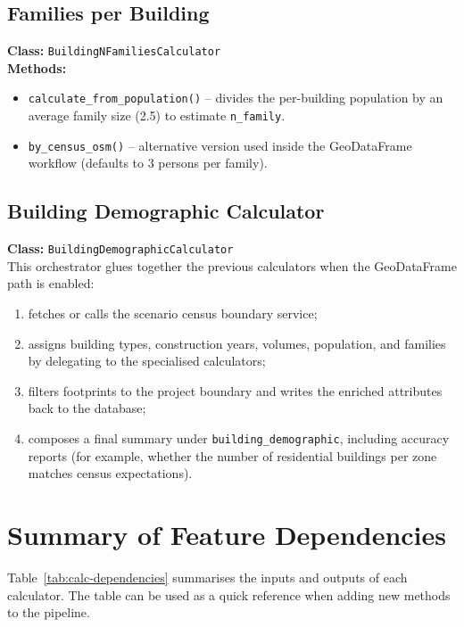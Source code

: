 \subsection{Families per Building}
\textbf{Class:} \texttt{BuildingNFamiliesCalculator}\\
\textbf{Methods:}
\begin{itemize}[leftmargin=2em]
    \item \texttt{calculate\_from\_population()} – divides the per-building
    population by an average family size (2.5) to estimate
    \texttt{n\_family}.
    \item \texttt{by\_census\_osm()} – alternative version used inside the
    GeoDataFrame workflow (defaults to 3 persons per family).
\end{itemize}

\subsection{Building Demographic Calculator}
\textbf{Class:} \texttt{BuildingDemographicCalculator}\\
This orchestrator glues together the previous calculators when the
GeoDataFrame path is enabled:
\begin{enumerate}[label=\alph*),leftmargin=2em]
    \item fetches or calls the scenario census boundary service;
    \item assigns building types, construction years, volumes, population,
    and families by delegating to the specialised calculators;
    \item filters footprints to the project boundary and writes the enriched
    attributes back to the database;
    \item composes a final summary under \texttt{building\_demographic},
    including accuracy reports (for example, whether the number of
    residential buildings per zone matches census expectations).
\end{enumerate}

\section{Summary of Feature Dependencies}
Table~\ref{tab:calc-dependencies} summarises the inputs and outputs of
each calculator. The table can be used as a quick reference when adding
new methods to the pipeline.

